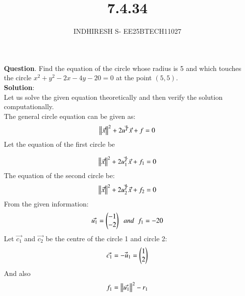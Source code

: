 \documentclass[journal]{IEEEtran}
\theoremstyle{remark}
\begin{document}

\onecolumn

\title{7.4.34}
\author{INDHIRESH S- EE25BTECH11027}
\maketitle


\renewcommand{\thefigure}{\theenumi}
\renewcommand{\thetable}{\theenumi}

\textbf{Question}. Find the equation of the circle whose radius is 5 and which touches the circle $x^2 +y^2 - 2x - 4y - 20 = 0$ at the point $(5, 5)$.\\
\textbf{Solution}:\\
Let us solve the given equation theoretically and then verify the solution computationally. \\
The general circle equation can be given as:
\begin{align}
  \left\lVert\Vec{x}\right\rVert^2+2\Vec{u^T}\Vec{x}+f=0
\end{align}
Let the equation of the first circle be

\begin{align}
  \left\lVert\Vec{x}\right\rVert^2+2\Vec{u_1^T}\Vec{x}+f_1=0
\end{align}
The equation of the second circle be:
\begin{align}
    \left\lVert\Vec{x}\right\rVert^2+2\Vec{u_2^T}\Vec{x}+f_2=0
\end{align}
From the given information:
\begin{align}
   \Vec{u_1}=\begin{pmatrix}-1\\-2\end{pmatrix}\;\;and\;\;f_1=-20
\end{align}
Let $\Vec{c_1}$ and $\Vec{c_2}$ be the centre of the circle 1 and circle 2:
\begin{align}
  \Vec{c_1}=\Vec{-u_1}=\begin{pmatrix}1\\2\end{pmatrix}
\end{align}
And also
\begin{align}
   f_1=\left\lVert\Vec{u_1}\right\rVert^2-r_1
\end{align}
\end{document}
